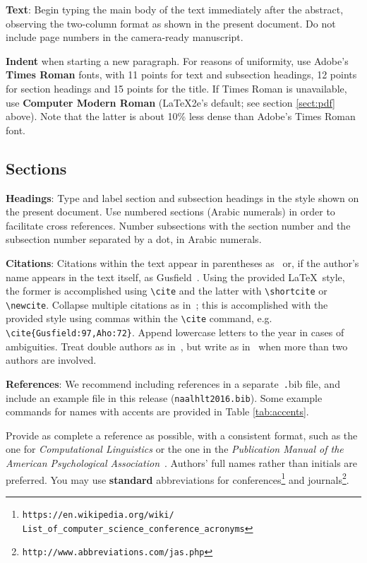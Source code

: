 \documentclass[11pt,letterpaper]{article}
\begin{document}
{\bf Text}: Begin typing the main body of the text immediately after
the abstract, observing the two-column format as shown in 
the present document.  Do not include page numbers in the camera-ready manuscript.  

{\bf Indent} when starting a new paragraph. For reasons of uniformity,
use Adobe's {\bf Times Roman} fonts, with 11 points for text and 
subsection headings, 12 points for section headings and 15 points for
the title.  If Times Roman is unavailable, use {\bf Computer Modern
  Roman} (\LaTeX2e{}'s default; see section \ref{sect:pdf} above).
Note that the latter is about 10\% less dense than Adobe's Times Roman
font.

\subsection{Sections}

{\bf Headings}: Type and label section and subsection headings in the
style shown on the present document.  Use numbered sections (Arabic
numerals) in order to facilitate cross references. Number subsections
with the section number and the subsection number separated by a dot,
in Arabic numerals. 

{\bf Citations}: Citations within the text appear
in parentheses as~\cite{Gusfield:97} or, if the author's name appears in
the text itself, as Gusfield~.  Using the provided \LaTeX\ style, the former is accomplished using
{\small\verb|\cite|} and the latter with {\small\verb|\shortcite|} or {\small\verb|\newcite|}.  Collapse multiple citations as in~\cite{Gusfield:97,Aho:72}; this is accomplished with the provided style using commas within the {\small\verb|\cite|} command, e.g. {\small\verb|\cite{Gusfield:97,Aho:72}|}.  
Append lowercase letters to the year in cases of ambiguities.  
Treat double authors as in~\cite{Aho:72}, but write as 
in~\cite{Chandra:81} when more than two authors are involved.  

\textbf{References}:  We recommend
including references in a separate~{\small\texttt .bib} file, and include an example file 
in this release ({\small\tt naalhlt2016.bib}).  Some example commands
for names with accents are provided in Table \ref{tab:accents}.  

Provide as complete a reference as possible, with a consistent format,
such as the one for {\em Computational Linguistics\/} or the one in the 
{\em Publication Manual of the American 
Psychological Association\/}~\cite{APA:83}.  Authors' full names rather than initials are preferred.  You may use
{\bf standard} abbreviations for conferences\footnote{\scriptsize {\tt https://en.wikipedia.org/wiki/ \\ \-\hspace{.75cm} List\_of\_computer\_science\_conference\_acronyms}} and journals\footnote{\tt http://www.abbreviations.com/jas.php}.
\end{document}
